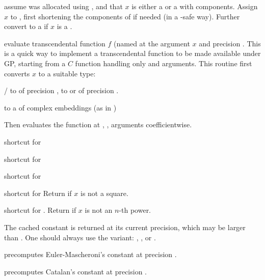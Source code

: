  assume  was allocated using
, and that $x$ is either a  or a 
with  components. Assign $x$ to , first shortening
the components of  if needed (in a -safe way). Further
convert  to a  if $x$ is a .

evaluate transcendental function $f$ (named  at the argument
$x$ and precision . This is a quick way to implement a transcendental
function to be made available under GP, starting from a $C$ function
handling only  and  arguments. This routine first
converts $x$ to a suitable type:

\item {}/ to  of precision ,  to
 or  of precision .

\item {} to a  of complex embeddings (as in )

Then evaluates the function at , ,  arguments
coefficientwise.


 shortcut for 

 shortcut for 

 shortcut for 

 shortcut for 
Return  if $x$ is not a square.

 shortcut for . Return  if $x$ is not an $n$-th power.


The cached constant is returned at its current precision, which may be larger
than . One should always use the  variant:
, , or .

 precomputes Euler-Mascheroni's constant
at precision .

 precomputes Catalan's constant at precision
.

